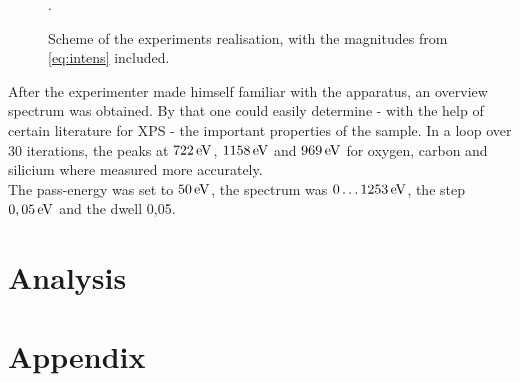 \documentclass[numbers=noenddot,a4paper]{article}
\begin{document}
			\begin{figure}[h]
				\centering
				\caption{Scheme of the experiments realisation, with the magnitudes from \autoref{eq:intens} included. \cite{XPSRapha}}.
				\label{img:aufbau}
			\end{figure}

		After the experimenter made himself familiar with the apparatus, an overview spectrum was obtained. By that one could easily determine - with the help of certain literature for XPS - the important properties of the sample. In a loop over 30 iterations, the peaks at $\unit[722]{eV}$, $\unit[1158]{eV}$ and $\unit[969]{eV}$ for oxygen, carbon and silicium where measured more accurately.\\
		The pass-energy was set to $\unit[50]{eV}$, the spectrum was $\unit[0\dots1253]{eV}$, the step $\unit[0,05]{eV}$ and the dwell 0,05.

	\clearpage
	\section{Analysis}
	
	\clearpage
	\section{Appendix}

		
		
\end{document}
